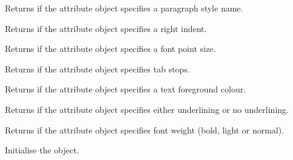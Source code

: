 \label{wxrichtextattrhasparagraphstylename}


Returns \true if the attribute object specifies a paragraph style name.

\label{wxrichtextattrhasrightindent}


Returns \true if the attribute object specifies a right indent.

\label{wxrichtextattrhassize}


Returns \true if the attribute object specifies a font point size.

\label{wxrichtextattrhastabs}


Returns \true if the attribute object specifies tab stops.

\label{wxrichtextattrhastextcolour}


Returns \true if the attribute object specifies a text foreground colour.

\label{wxrichtextattrhasunderlined}


Returns \true if the attribute object specifies either underlining or no underlining.

\label{wxrichtextattrhasweight}


Returns \true if the attribute object specifies font weight (bold, light or normal).

\label{wxrichtextattrinit}


Initialise the object.

\label{wxrichtextattrischaracterstyle}


